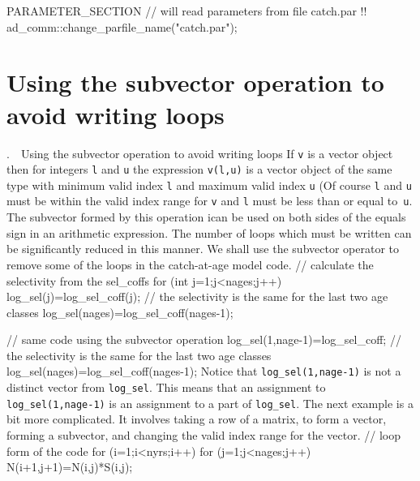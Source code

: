 \documentclass[12pt]{book}
\makeatletter
\def\mysection#1{\section{#1}{\bigbf \medbreak\noindent\number\c@chapter.\number\c@section\ \ #1\medbreak}}
\makeatother
\begin{document}
PARAMETER_SECTION
 // will read parameters from file catch.par
 !! ad_comm::change_parfile_name("catch.par");
\endexample
\mysection{Using the subvector operation to avoid writing loops}
If {\tt v} is a vector object then for integers {\tt l} and {\tt u}
the expression {\tt v(l,u)} is a vector object of the same type
with minimum valid index {\tt l} and maximum valid index {\tt u}
(Of course {\tt l} and {\tt u} must be within the valid index range for
{\tt v} and {\tt l} must be less than or equal to~{\tt u}.
The subvector formed by this operation ican be used on both sides of
the equals sign in an arithmetic expression. The  number of loops which must be
written can be significantly reduced in this manner. We shall use the subvector
operator to remove some of the loops in the catch-at-age model code.
\beginexample
  // calculate the selectivity from the sel_coffs
  for (int j=1;j<nages;j++)
  {
    log_sel(j)=log_sel_coff(j);
  }
  // the selectivity is the same for the last two age classes
  log_sel(nages)=log_sel_coff(nages-1);

  // same code using the subvector operation
  log_sel(1,nage-1)=log_sel_coff;
  // the selectivity is the same for the last two age classes
  log_sel(nages)=log_sel_coff(nages-1);
\endexample
\noindent Notice that {\tt log\_sel(1,nage-1)} is not a distinct vector
from  {\tt log\_sel}. This means that an assignment to {\tt log\_sel(1,nage-1)}
is an assignment to a part of {\tt log\_sel}.
The next example is a bit more complicated. It involves taking a row of a matrix,
to form a vector, forming a subvector, and changing the valid index range
for the vector.
\bestbreak
\beginexample
  // loop form of the code
  for (i=1;i<nyrs;i++)
  {
    for (j=1;j<nages;j++)
    {
      N(i+1,j+1)=N(i,j)*S(i,j);
    }
  }
\end{document}
